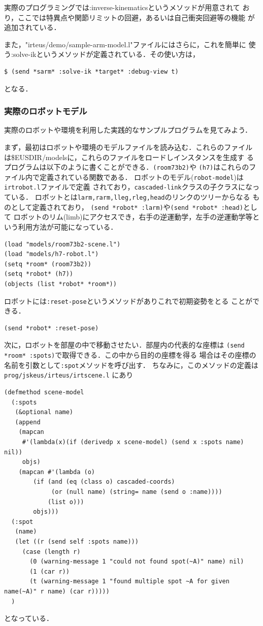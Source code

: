 実際のプログラミングでは:inverse-kinematicsというメソッドが用意されて
おり，ここでは特異点や関節リミットの回避，あるいは自己衝突回避等の機能
が追加されている．

また，"irteus/demo/sample-arm-model.l"ファイルにはさらに，これを簡単に
使う:solve-ikというメソッドが定義されている．その使い方は，

{\baselineskip=10pt
\begin{verbatim}
$ (send *sarm* :solve-ik *target* :debug-view t)
\end{verbatim}
}

となる．

\subsubsection{実際のロボットモデル}

実際のロボットや環境を利用した実践的なサンプルプログラムを見てみよう．

まず，最初はロボットや環境のモデルファイルを読み込む．これらのファイル
は\${EUSDIR}/modelsに，これらのファイルをロードしインスタンスを生成す
るプログラムは以下のように書くことができる．\verb|(room73b2)|や
\verb|(h7)|はこれらのファイル内で定義されている関数である．
ロボットのモデル(\verb|robot-model|)は\verb|irtrobot.l|ファイルで定義
されており，\verb|cascaded-link|クラスの子クラスになっている．
ロボットとは\verb|larm,rarm,lleg,rleg,head|のリンクのツリーからなる
ものとして定義されており，
\verb|(send *robot* :larm)|や\verb|(send *robot* :head)|として
ロボットのリム(limb)にアクセスでき，右手の逆運動学，左手の逆運動学等と
いう利用方法が可能になっている．

{\baselineskip=10pt
\begin{verbatim}
(load "models/room73b2-scene.l")
(load "models/h7-robot.l")
(setq *room* (room73b2))
(setq *robot* (h7))
(objects (list *robot* *room*))
\end{verbatim}
}

ロボットには\verb|:reset-pose|というメソッドがありこれで初期姿勢をとる
ことができる．
{\baselineskip=10pt
\begin{verbatim}
(send *robot* :reset-pose)
\end{verbatim}
}

次に，ロボットを部屋の中で移動させたい．部屋内の代表的な座標は
\verb|(send *room* :spots)|で取得できる．この中から目的の座標を得る
場合はその座標の名前を引数として\verb|:spot|メソッドを呼び出す．
ちなみに，このメソッドの定義は\verb|prog/jskeus/irteus/irtscene.l|
にあり
{\baselineskip=10pt
\begin{verbatim}
(defmethod scene-model
  (:spots
   (&optional name)
   (append
    (mapcan
     #'(lambda(x)(if (derivedp x scene-model) (send x :spots name) nil))
     objs)
    (mapcan #'(lambda (o)
		(if (and (eq (class o) cascaded-coords)
			 (or (null name) (string= name (send o :name))))
		    (list o)))
	    objs)))
  (:spot
   (name)
   (let ((r (send self :spots name)))
     (case (length r)
       (0 (warning-message 1 "could not found spot(~A)" name) nil)
       (1 (car r))
       (t (warning-message 1 "found multiple spot ~A for given name(~A)" r name) (car r)))))
  )
\end{verbatim}
}
となっている．

